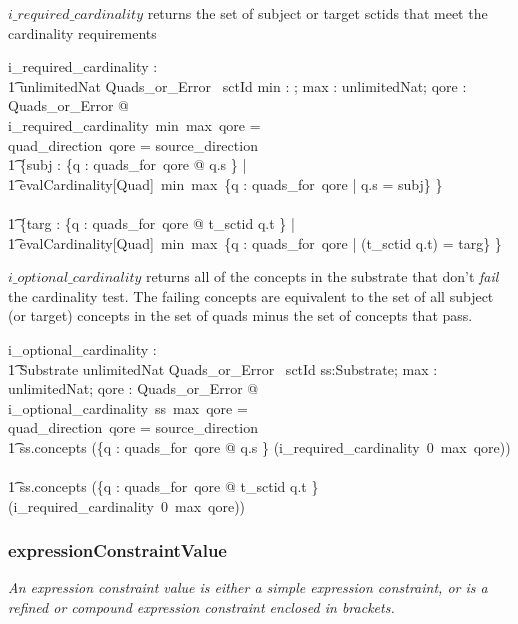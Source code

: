 \documentclass{article}
\def\desc#1{{\small \textsl{{#1}} }}
\begin{document}
$i\_required\_cardinality$ returns the set of subject or target sctids that meet the cardinality requirements
\begin{axdef}
   i\_required\_cardinality : \\
\t1 \nat \fun unlimitedNat \fun Quads\_or\_Error \ \fun \power sctId
\where
   \forall min : \nat; max : unlimitedNat; qore : Quads\_or\_Error  @ \\
i\_required\_cardinality~min~max~qore = \\
\IF quad\_direction~qore = source\_direction \THEN \\
\t1 \{subj :  \{q : quads\_for~qore @ q.s \} | \\
\t1 evalCardinality[Quad]~min~max~\{q : quads\_for~qore | q.s = subj\} \neq \emptyset \} \\
\ELSE \\
\t1 \{targ :  \{q : quads\_for~qore @ t\_sctid \inv q.t \} | \\
\t1 evalCardinality[Quad]~min~max~\{q : quads\_for~qore | (t\_sctid \inv q.t) = targ\} \neq \emptyset \}
\end{axdef}

$i\_optional\_cardinality$ returns all of the concepts in the substrate that don't \emph{fail} the cardinality test.  The failing concepts
are equivalent to the set of all subject (or target) concepts in the set of quads minus the set of concepts that pass.

\begin{axdef}
   i\_optional\_cardinality : \\
\t1 Substrate \fun unlimitedNat \fun Quads\_or\_Error \ \fun \power sctId
\where
   \forall ss:Substrate; max : unlimitedNat; qore : Quads\_or\_Error  @ \\
i\_optional\_cardinality~ss~max~qore = \\
\IF quad\_direction~qore = source\_direction \THEN \\
\t1 ss.concepts \setminus (\{q : quads\_for~qore @ q.s \} \setminus (i\_required\_cardinality~0~max~qore)) \\
\ELSE \\
\t1 ss.concepts \setminus (\{q : quads\_for~qore @ t\_sctid \inv q.t \} \setminus (i\_required\_cardinality~0~max~qore)) 
\end{axdef}



\subsubsection{expressionConstraintValue}
\begin{framed}
\desc{An expression constraint value is either a simple expression constraint, or is a refined or compound expression constraint enclosed in brackets.}
\end{framed}
\end{document}
